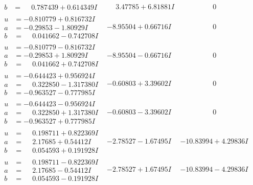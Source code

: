 \documentclass[1p]{elsarticle_modified}
\theoremstyle{definition}
\begin{document}
$$\begin{array}{c|c|c}
\begin{aligned}
b &= \phantom{-}0.787439 + 0.614349 I\end{aligned}
 & \phantom{-}3.47785 + 6.81881 I & \phantom{-0.000000 } 0 \\ \hline\begin{aligned}
u &= -0.810779 + 0.816732 I \\
a &= -0.29853 - 1.80929 I \\
b &= \phantom{-}0.041662 - 0.742708 I\end{aligned}
 & -8.95504 + 0.66716 I & \phantom{-0.000000 } 0 \\ \hline\begin{aligned}
u &= -0.810779 - 0.816732 I \\
a &= -0.29853 + 1.80929 I \\
b &= \phantom{-}0.041662 + 0.742708 I\end{aligned}
 & -8.95504 - 0.66716 I & \phantom{-0.000000 } 0 \\ \hline\begin{aligned}
u &= -0.644423 + 0.956924 I \\
a &= \phantom{-}0.322850 - 1.317380 I \\
b &= -0.963527 - 0.777985 I\end{aligned}
 & -0.60803 + 3.39602 I & \phantom{-0.000000 } 0 \\ \hline\begin{aligned}
u &= -0.644423 - 0.956924 I \\
a &= \phantom{-}0.322850 + 1.317380 I \\
b &= -0.963527 + 0.777985 I\end{aligned}
 & -0.60803 - 3.39602 I & \phantom{-0.000000 } 0 \\ \hline\begin{aligned}
u &= \phantom{-}0.198711 + 0.822369 I \\
a &= \phantom{-}2.17685 + 0.54412 I \\
b &= \phantom{-}0.054593 + 0.191928 I\end{aligned}
 & -2.78527 - 1.67495 I & -10.83994 + 4.29836 I \\ \hline\begin{aligned}
u &= \phantom{-}0.198711 - 0.822369 I \\
a &= \phantom{-}2.17685 - 0.54412 I \\
b &= \phantom{-}0.054593 - 0.191928 I\end{aligned}
 & -2.78527 + 1.67495 I & -10.83994 - 4.29836 I \\ \hline\begin{aligned}

\end{aligned}
\end{array}$$
\end{document}
